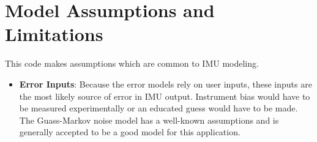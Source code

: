 \section{Model Assumptions and Limitations}
This code makes assumptions which are common to IMU modeling.
\begin{itemize}
	\item \textbf{Error Inputs}: Because the error models rely on user inputs, these inputs are the most likely source of error in IMU output. Instrument bias would have to be measured experimentally or an educated guess would have to be made. The Guass-Markov noise model has a well-known assumptions and is generally accepted to be a good model for this application.
\end{itemize}